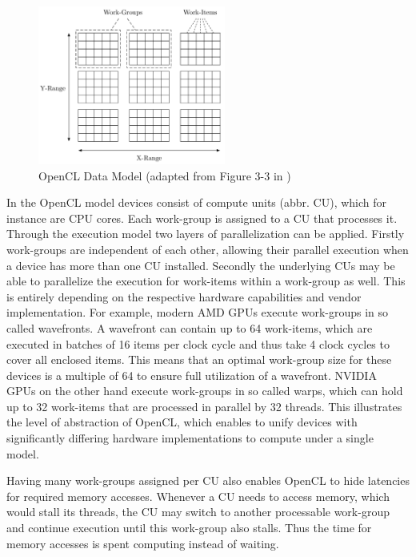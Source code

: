 \begin{figure}[!htb]
	\includegraphics[width=0.55\textwidth]{drawings/opencl_data_model.pdf}
	\centering
	\caption{OpenCL Data Model (adapted from Figure 3-3 in \cite{opencl_spec})}
	\label{img:opencl_data_model}
\end{figure}

In the OpenCL model devices consist of compute units (abbr. CU), which for instance are CPU cores. Each work-group is assigned to a CU that processes it. Through the execution model two layers of parallelization can be applied. Firstly work-groups are independent of each other, allowing their parallel execution when a device has more than one CU installed. Secondly the underlying CUs may be able to parallelize the execution for work-items within a work-group as well. This is entirely depending on the respective hardware capabilities and vendor implementation. For example, modern AMD GPUs execute work-groups in so called wavefronts. A wavefront can contain up to 64 work-items, which are executed in batches of 16 items per clock cycle and thus take 4 clock cycles to cover all enclosed items\cite{amd_opencl_spec}. This means that an optimal work-group size for these devices is a multiple of 64 to ensure full utilization of a wavefront.
NVIDIA GPUs on the other hand execute work-groups in so called warps, which can hold up to 32 work-items that are processed in parallel by 32 threads\cite{nvidia_pascal_spec}. This illustrates the level of abstraction of OpenCL, which enables to unify devices with significantly differing hardware implementations to compute under a single model.

Having many work-groups assigned per CU also enables OpenCL to hide latencies for required memory accesses. Whenever a CU needs to access memory, which would stall its threads, the CU may switch to another processable work-group and continue execution until this work-group also stalls. Thus the time for memory accesses is spent computing instead of waiting.


